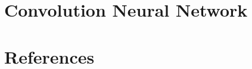 % 

% 
% 
% 
% 

% 
% 
% 

\section[CNN]{Convolution Neural Network}



% 

% 
% 

 
 
% 


 \section[Refs]{References}
 
